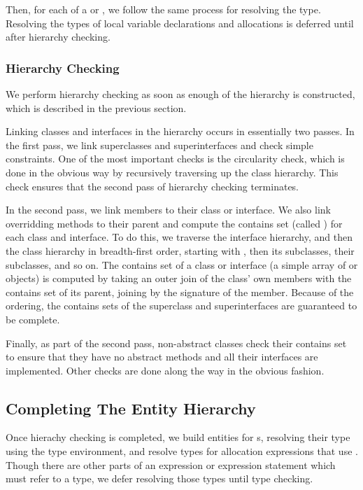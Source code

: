 \documentclass[pdftex,11pt,a4paper]{article}
\begin{document}
Then, for each  of a  or
, we follow the same process for resolving the
type. Resolving the types of local variable declarations and
allocations is deferred until after hierarchy checking.

\subsubsection{Hierarchy Checking}

We perform hierarchy checking as soon as enough of the hierarchy is
constructed, which is described in the previous section.

Linking classes and interfaces in the hierarchy occurs in essentially
two passes. In the first pass, we link superclasses and
superinterfaces and check simple constraints. One of the most
important checks is the circularity check, which is done in the
obvious way by recursively traversing up the class hierarchy. This
check ensures that the second pass of hierarchy checking terminates.

In the second pass, we link members to their class or interface. We
also link overridding methods to their parent and compute the contains
set (called ) for each class and interface. To do
this, we traverse the interface hierarchy, and then the class
hierarchy in breadth-first order, starting with
, then its subclasses, their subclasses, and
so on. The contains set of a class or interface (a simple array of
 or  objects) is computed by taking an outer
join of the class' own members with the contains set of its parent,
joining by the signature of the member. Because of the ordering,
the contains sets of the superclass and superinterfaces are guaranteed
to be complete.

Finally, as part of the second pass, non-abstract classes check their
contains set to ensure that they have no abstract methods and all
their interfaces are implemented. Other checks are done along the way
in the obvious fashion.

\subsection{Completing The Entity Hierarchy}

Once hierachy checking is completed, we build entities for
s, resolving their type using the type
environment, and resolve types for allocation expressions that use
. Though there are other parts of an expression or expression
statement which must refer to a type, we defer resolving those types
until type checking.
\end{document}
